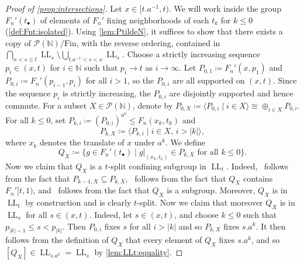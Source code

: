 \documentclass[reqno,12pt]{amsart}\setcounter{tocdepth}{1}
\theoremstyle{definition}
\newcommand{\N}{\mathbb{N}}
\DeclareMathOperator{\LL}{LL}
\numberwithin{equation}{section}
\begin{document}
\begin{proof}[Proof of \cref{prop:intersections}]
Let $x\in [t.a^{-1},t)$. We will work inside the group $F_n'(t_\bullet)$ of elements of $F_n'$ fixing neighborhoods of each $t_k$ for $k\le 0$ (\cref{def:Fnt:isolated}). Using \cref{lem:PtildeN}, it suffices to show that there exists a copy of $\mathcal{P}(\N)/\mathrm{Fin}$, with the reverse ordering, contained in $\displaystyle \bigcap_{x < s \leq t} \LL_s \setminus \bigcup_{t.a^{-1}<s<x}\LL_s$. Choose a strictly increasing sequence $p_i \in (x, t)$ for $i \in \N$ such that $p_i \to t$ as $i \to \infty$. Let $P_{0,1} \coloneqq F_n'(x,p_1)$ and $P_{0,i} \coloneqq F_n'(p_{i-1},p_i)$ for all $i>1$, so the $P_{0,i}$ are all supported on $(x,t)$. Since the sequence $p_i$ is strictly increasing, the $P_{0,i}$ are disjointly supported and hence commute. For a subset $X \in \mathcal{P}(\N)$, denote by $P_{0,X} \coloneqq \langle P_{0,i} \mid i\in X \rangle \cong  \oplus_{i \in X} P_{0,i}$. For all $k\le 0$, set $P_{k,i} \coloneqq (P_{0,i})^{a^k} \le F_n(x_k,t_k)$ and
\[
P_{k,X} \coloneqq \langle P_{k,i} \mid i \in X\text{, } i > |k| \rangle,
\]
where $x_k$ denotes the translate of $x$ under $a^k$. We define
\[
Q_X \coloneqq \{ g \in F_n'(t_\bullet) \mid g|_{(x_k,t_k)} \in P_{k,X} \text{ for all } k \le 0 \}.
\]
Now we claim that $Q_X$ is a $t$-split confining subgroup in $\LL_t$. Indeed, \StayInConf\ follows from the fact that $P_{k-1,X} \subseteq P_{k,X}$, \GetInConf\ follows from the fact that $Q_X$ contains $F_n'[t, 1)$, and \ProdConf\ follows from the fact that $Q_X$ is a subgroup. Moreover, $Q_X$ is in $\LL_t$ by construction and is clearly $t$-split. Now we claim that moreover $Q_X$ is in $\LL_s$ for all $s\in (x,t)$.
Indeed, let $s\in (x,t)$, and choose $k \leq 0$ such that $p_{|k|-1} \leq s < p_{|k|}$. Then $P_{0, i}$ fixes $s$ for all $i > |k|$ and so $P_{k, X}$ fixes $s.a^k$. It then follows from the definition of $Q_X$ that every element of $Q_X$ fixes $s.a^k$, and so $[Q_X] \in \LL_{s.a^k} = \LL_s$ by \cref{lem:LLt:equality}. 


\end{proof}
\end{document}
